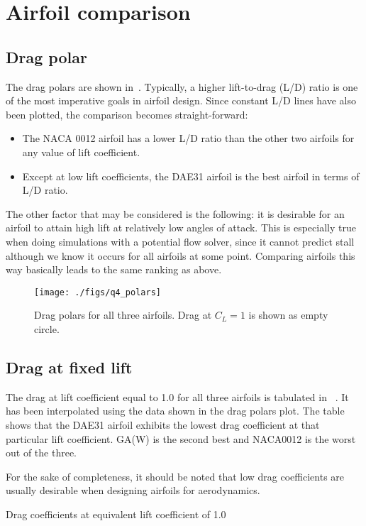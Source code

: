 \section{Airfoil comparison}
\subsection{Drag polar}
The drag polars are shown in~. Typically, a higher lift-to-drag (L/D) ratio
is one of the most imperative goals in airfoil design.
Since constant L/D lines have also been plotted, the comparison becomes straight-forward:
\begin{itemize}
    \item The NACA 0012 airfoil has a lower L/D ratio than the other two airfoils
        for any value of lift coefficient.
    \item Except at low lift coefficients, the DAE31 airfoil is the best airfoil in terms
        of L/D ratio.
\end{itemize}
The other factor that may be considered is the following: it is desirable for an airfoil
to attain high lift at relatively low angles of attack. This is especially true when
doing simulations with a potential flow solver, since it cannot predict stall although
we know it occurs for all airfoils at some point. Comparing airfoils this way basically
leads to the same ranking as above.
\begin{figure}
    \centering
    \texttt{[image: ./figs/q4\_polars]}
    \caption{Drag polars for all three airfoils. Drag at $C_L = 1$ is shown as
        empty circle.}\label{fig:q4_polars}
\end{figure}

\subsection{Drag at fixed lift}
The drag at lift coefficient equal to 1.0 for all three airfoils is tabulated in
~. It has been interpolated using the data shown in the drag polars
plot. The table shows that the DAE31 airfoil exhibits the lowest drag coefficient
at that particular lift coefficient. GA(W) is the second best and NACA0012 is the
worst out of the three.

For the sake of completeness, it should be noted that low drag coefficients are usually
desirable when designing airfoils for aerodynamics.
\begin{table}
    \centering
    \caption{Drag coefficients at equivalent lift coefficient of 1.0}
    \label{tab:q4}
    
\end{table}

